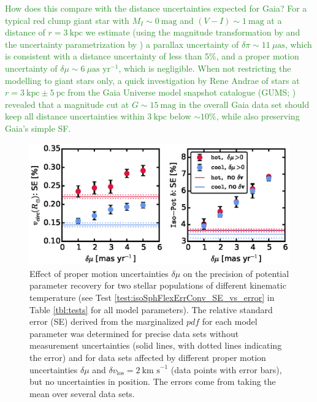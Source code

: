\documentclass[iop,revtex4,numberedappendix,appendixfloats]{emulateapj}
\newcommand{\pdf}{\ensuremath{pdf}}
\newcommand{\NEW}[1]{\textcolor{ForestGreen}{#1}}
\begin{document}
\NEW{How does this compare with the distance uncertainties expected for Gaia? For a typical red clump giant star with $M_I\sim0~\text{mag}$ and $(V-I)\sim1~\text{mag}$ at a distance of $r=3~\text{kpc}$ we estimate (using the magnitude transformation by \citet{2010A&A...523A..48J} and the uncertainty parametrization by \citet{2014EAS....67...23D}) a parallax uncertainty of $\delta\pi\sim11~\mu\text{as}$, which is consistent with a distance uncertainty of less than 5\%, and a proper motion uncertainty of $\delta \mu\sim6~\mu\text{as yr}^{-1}$, which is negligible. When not restricting the modelling to giant stars only, a quick investigation by Rene Andrae of stars at $r=3~\text{kpc}\pm5~\text{pc}$ from the Gaia Universe model snapshot catalogue (GUMS; \citealt{2012A&A...543A.100R}) revealed that a magnitude cut at $G\sim15~\text{mag}$ in the overall Gaia data set should keep all distance uncertainties within $3~\text{kpc}$ below $\sim10\%$, while also preserving Gaia's simple SF.}

\begin{figure}[!htbp]
\centering
\includegraphics[width=\columnwidth]{figs/isoSphFlexErrConv_SE_vs_error.eps}
\caption{Effect of proper motion uncertainties $\delta \mu$ on the precision of potential parameter recovery for two stellar populations of different kinematic temperature (see Test \ref{test:isoSphFlexErrConv_SE_vs_error} in Table \ref{tbl:tests} for all model parameters). The relative standard error (SE) derived from the marginalized \pdf{} for each model parameter was determined for precise data sets without measurement uncertainties (solid lines, with dotted lines indicating the error) and for data sets affected by different proper motion uncertainties $\delta \mu$ and $\delta v_\text{los}=2~\text{km s}^{-1}$ (data points with error bars), but no uncertainties in position. The errors come from taking the mean over several data sets.}
\label{fig:isoSphFlexErrConv_SE_vs_error}
\end{figure}
\end{document}

